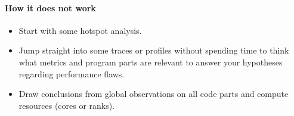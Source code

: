 \paragraph*{How it does not work}

\begin{itemize}[noitemsep]
  \item[$\boxminus$] Start with some hotspot analysis.
  \item[$\boxminus$] Jump straight into some traces or profiles without spending time to
  think what metrics and program parts are relevant to answer your
  hypotheses regarding  performance flaws.
  \item[$\boxminus$] Draw conclusions from global observations on all code parts
  and compute resources (cores or ranks).
\end{itemize}
